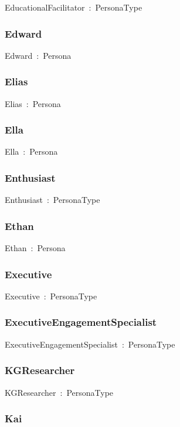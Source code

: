\documentclass{article}
\begin{document}
EducationalFacilitator~:~PersonaType

\subsubsection*{Edward}

Edward~:~Persona

\subsubsection*{Elias}

Elias~:~Persona

\subsubsection*{Ella}

Ella~:~Persona

\subsubsection*{Enthusiast}

Enthusiast~:~PersonaType

\subsubsection*{Ethan}

Ethan~:~Persona

\subsubsection*{Executive}

Executive~:~PersonaType

\subsubsection*{ExecutiveEngagementSpecialist}

ExecutiveEngagementSpecialist~:~PersonaType

\subsubsection*{KGResearcher}

KGResearcher~:~PersonaType

\subsubsection*{Kai}
\end{document}
